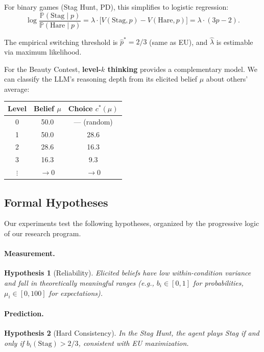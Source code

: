\documentclass[12pt]{article}
\newtheorem{hypothesis}{Hypothesis}
\newcommand{\Prob}{\mathbb{P}}
\begin{document}
For binary games (Stag Hunt, PD), this simplifies to logistic regression:
\begin{equation}
    \log \frac{\Prob(\text{Stag} \mid p)}{\Prob(\text{Hare} \mid p)} = \lambda \cdot \big[V(\text{Stag}, p) - V(\text{Hare}, p)\big] = \lambda \cdot (3p - 2).
    \label{eq:logistic_sh}
\end{equation}

The empirical switching threshold is $\hat{p}^* = 2/3$ (same as EU), and $\hat\lambda$ is estimable via maximum likelihood.

For the Beauty Contest, \textbf{level-$k$ thinking} \citep{nagel1995unraveling, stahl1994experimental} provides a complementary model. We can classify the LLM's reasoning depth from its elicited belief $\mu$ about others' average:
\begin{center}
\begin{tabular}{ccc}
\toprule
Level & Belief $\mu$ & Choice $c^*(\mu)$ \\
\midrule
0 & 50.0 & --- (random) \\
1 & 50.0 & 28.6 \\
2 & 28.6 & 16.3 \\
3 & 16.3 & 9.3 \\
$\vdots$ & $\to 0$ & $\to 0$ \\
\bottomrule
\end{tabular}
\end{center}


\subsection{Formal Hypotheses}
\label{sec:hypotheses}

Our experiments test the following hypotheses, organized by the progressive logic of our research program.

\paragraph{Measurement.}
\begin{hypothesis}[Reliability]
\label{hyp:reliability}
Elicited beliefs have low within-condition variance and fall in theoretically meaningful ranges (e.g., $b_i \in [0,1]$ for probabilities, $\mu_i \in [0,100]$ for expectations).
\end{hypothesis}

\paragraph{Prediction.}
\begin{hypothesis}[Hard Consistency]
\label{hyp:hard}
In the Stag Hunt, the agent plays Stag if and only if $b_i(\text{Stag}) > 2/3$, consistent with EU maximization.
\end{hypothesis}
\end{document}
